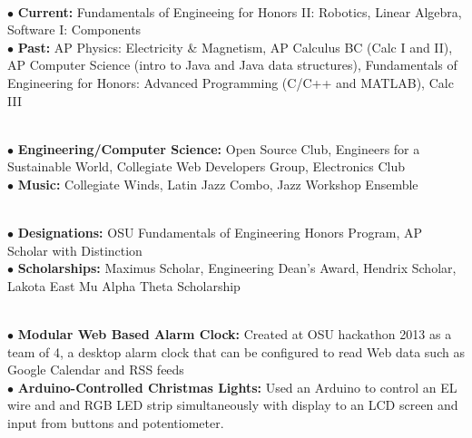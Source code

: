 \documentclass[10pt]{article}
\begin{document}
\\
\smallskip
$\bullet$ {\bf Current:} Fundamentals of Engineeing for Honors II: Robotics, Linear Algebra, Software I: Components\\
$\bullet$ {\bf Past:} AP Physics: Electricity \& Magnetism, AP Calculus BC (Calc I and II), AP Computer Science (intro to Java and Java data structures), Fundamentals of Engineering for Honors: Advanced Programming (C/C++ and MATLAB), Calc III
\medskip

\\
\smallskip
$\bullet$ {\bf Engineering/Computer Science:} Open Source Club, Engineers for a Sustainable World, Collegiate Web Developers Group, Electronics Club\\
$\bullet$ {\bf Music:} Collegiate Winds, Latin Jazz Combo, Jazz Workshop Ensemble
\medskip

\\
\smallskip
$\bullet$ {\bf Designations:} OSU Fundamentals of Engineering Honors Program, AP Scholar with Distinction\\
$\bullet$ {\bf Scholarships:} Maximus Scholar, Engineering Dean's Award, Hendrix Scholar, Lakota East Mu Alpha Theta Scholarship
\medskip

\\
\smallskip
$\bullet$ {\bf Modular Web Based Alarm Clock:} Created at OSU hackathon 2013 as a team of 4, a desktop alarm clock that can be configured to read Web data such as Google Calendar and RSS feeds\\
$\bullet$ {\bf Arduino-Controlled Christmas Lights:} Used an Arduino to control an EL wire and and RGB LED strip simultaneously with display to an LCD screen and input from buttons and potentiometer.
\medskip
\end{document}
